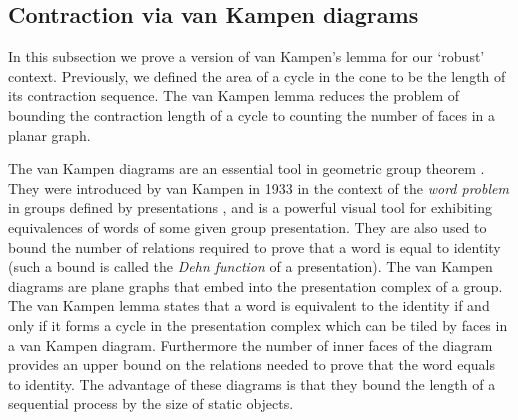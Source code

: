 

\subsection{Contraction via van Kampen diagrams}\label{sec:van-Kampen}
In this subsection we prove a version of van Kampen's lemma for our `robust' context. Previously, we defined the area of a cycle in the cone to be the length of its contraction sequence. The van Kampen lemma reduces the problem of bounding the contraction length of a cycle to counting the number of faces in a planar graph. 

The van Kampen diagrams are an essential tool in geometric group theorem \cite[Chapter V]{LyndonS1977}. They were introduced by van Kampen in 1933 in the context of the \emph{word problem} in groups defined by presentations \cite{VanKampen1933}, and is a powerful visual tool for exhibiting equivalences of words of some given group presentation. They are also used to bound the number of relations required to prove that a word is equal to identity (such a bound is called the \emph{Dehn function} of a presentation). 
The van Kampen diagrams are plane graphs that embed into the presentation complex of a group. 
 The van Kampen lemma states that a word is equivalent to the identity if and only if it forms a cycle in the presentation complex which can be tiled by faces in a van Kampen diagram. Furthermore the number of inner faces of the diagram provides an upper bound on the relations needed to prove that the word equals to identity. 
The advantage of these diagrams is that they bound the length of a sequential process by the size of static objects.


